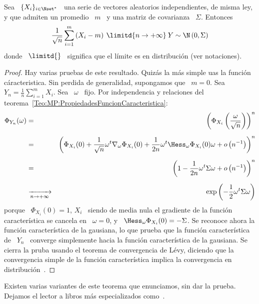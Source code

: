 \begin{teorema}\label{Teo:MP:CLT}
%
  Sea  \  $\{  X_i \}_{i  \in  \Nset^*}$  \  una  serie de  vectores  aleatorios
  independientes, de misma ley,  y que admiten un promedio \ $m$  \ y una matriz
  de covarianza \ $\Sigma$. Entonces
  \[
  \frac{1}{\sqrt{n}}  \sum_{i=1}^m  \left( X_i  -  m  \right)  \: \limitd{n  \to
    +\infty} \: Y \sim \N\left( 0 , \Sigma \right)
  \]
  donde  \ $\limitd{}$ \  significa que  el l\'imite  es en  distribuci\'on (ver
  notaciones).
\end{teorema}
\begin{proof}
  Hay  varias  pruebas de  este  resultado.  Quiz\'as  la  m\'as  simple uas  la
  funci\'on c\'aracteristica.  Sin perdida de generalidad, supongamos que \ $m =
  0$. Sea \ $\displaystyle Y_n  = \frac{1}{n} \sum_{i=1}^m X_i$.  Sea \ $\omega$
  \       fijo.       Por       independencia       y       relaciones       del
  teorema~\ref{Teo:MP:PropiedadesFuncionCaracteristica}:
  \begin{eqnarray*}
  \Phi_{Y_n}(\omega) & = & \left( \Phi_{X_i}\left( \frac{\omega}{\sqrt{n}}
  \right) \right)^n\\[2mm]
  & = & \left( \Phi_{X_i}(0) + \frac{1}{\sqrt{n}} \omega^t \nabla_\omega
  \Phi_{X_i}(0) + \frac{1}{2 n} \omega^t \Hess_\omega\Phi_{X_i}(0) \omega +
  o\left( n^{-1} \right) \right)^n\\[2mm]
  & = & \left( 1 - \frac{1}{2 n} \omega^t \Sigma \omega +
  o\left( n^{-1} \right) \right)^n\\[2mm]
  & \xrightarrow[n \to +\infty]{} & \exp\left( -\frac12 \omega^t \Sigma \omega \right)
  \end{eqnarray*}
  porque \ $\Phi_{X_i}(0) = 1$, $X_i$ \  siendo de media nula el gradiente de la
  funci\'on   caracter\'istica   se  cancela   en   \   $\omega   =  0$,   y   \
  $\Hess_\omega\Phi_{X_i}(0)  =  -  \Sigma$.   Se reconoce  ahora  la  funci\'on
  caracter\'istica   de  la   gausiana,   lo  que   prueba   que  la   funci\'on
  caracter\'istica  de  \  $Y_n$  \  converge  simplemente  hacia  la  funci\'on
  caracter\'istica  de la gausiana.   Se cierra  la pruba  usando el  teorema de
  convergencia de  L\'evy, diciendo que  la convergencia simple de  la funci\'on
  caracter\'istica  implica  la  convergencia en  distribuci\'on~\cite{AshDol99,
    Bil12, AthLah06}.
\end{proof}

Existen  varias   variantes  de  este   teorema  que  enunciamos,  sin   dar  la
prueba.  Dejamos el  lector a  libros m\'as  especializados como~\cite{AshDol99,
  Bil12, AthLah06, Lin22}.

